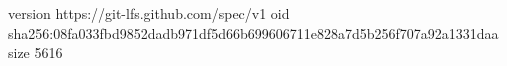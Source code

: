 version https://git-lfs.github.com/spec/v1
oid sha256:08fa033fbd9852dadb971df5d66b699606711e828a7d5b256f707a92a1331daa
size 5616
